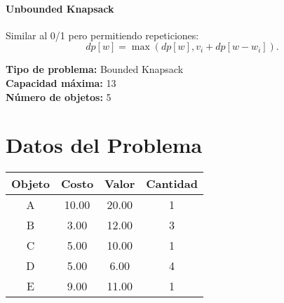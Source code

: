 \documentclass{article}
\begin{document}
\paragraph{Unbounded Knapsack} Similar al 0/1 pero permitiendo repeticiones:
\[
dp[w] = \max ( dp[w], v_i + dp[w - w_i] ).
\]

\thispagestyle{empty}
\newpage
\textbf{Tipo de problema:} Bounded Knapsack\\
\textbf{Capacidad máxima:} 13\\
\textbf{Número de objetos:} 5\\

\section*{Datos del Problema}
\begin{tabular}{|c|c|c|c|}
\hline
Objeto & Costo & Valor & Cantidad \\
\hline
A & 10.00 & 20.00 & 1 \\
B & 3.00 & 12.00 & 3 \\
C & 5.00 & 10.00 & 1 \\
D & 5.00 & 6.00 & 4 \\
E & 9.00 & 11.00 & 1 \\
\hline
\end{tabular}
\end{document}
